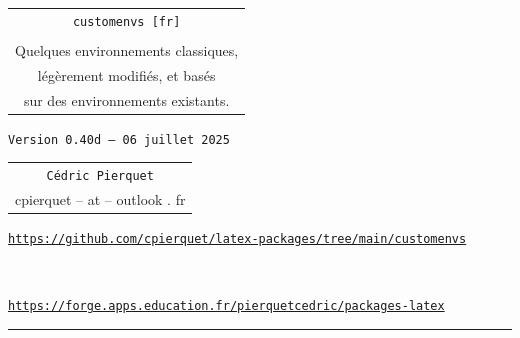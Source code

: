 \documentclass[french,11pt,a4paper]{article}
\def\TPversion{0.40d}
\def\TPdate{06 juillet 2025}
\begin{document}
\pagestyle{fancy}

\thispagestyle{empty}

\begin{center}
	\begin{minipage}{0.75\linewidth}
	\begin{tcolorbox}[colframe=yellow,colback=yellow!15]
		\begin{center}
			\renewcommand\arraystretch{1.25}
			\begin{tabular}{c}
				{\Huge \texttt{customenvs [fr]}}\\
				\\
				{\Large Quelques environnements classiques,} \\
				{\Large légèrement modifiés, et basés} \\
				{\Large sur des environnements existants.} \\
			\end{tabular}
			\renewcommand\arraystretch{1}
			
			\medskip
			
			{\small \texttt{Version \TPversion{} -- \TPdate}}
		\end{center}
	\end{tcolorbox}
\end{minipage}
\end{center}

\begin{center}
	\begin{tabular}{c}
		\texttt{Cédric Pierquet}\\
		{\ttfamily cpierquet -- at -- outlook . fr}
	\end{tabular}
\end{center}

\begin{center}
\begin{minipage}{0.85\linewidth}
	\begin{tcolorbox}[colframe=teal,colback=teal!10,halign=center,fontupper=\footnotesize]
		\texttt{\url{https://github.com/cpierquet/latex-packages/tree/main/customenvs}}
		
		~
		
		\texttt{\url{https://forge.apps.education.fr/pierquetcedric/packages-latex}}
	\end{tcolorbox}
\end{minipage}
\end{center}

\vspace*{5mm}

\hrule
\end{document}
